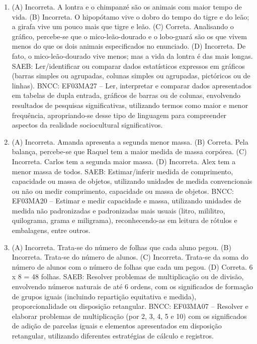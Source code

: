 \begin{enumerate}
\item
(A) Incorreta. A lontra e o chimpanzé são os animais com maior tempo de vida.
(B) Incorreta. O hipopótamo vive o dobro do tempo do tigre e do leão; a girafa vive um pouco mais que tigre e leão.
(C) Correta. Analisando o gráfico, percebe-se que o mico-leão-dourado e o lobo-guará são os que vivem menos do que os dois animais especificados no enunciado.
(D) Incorreta. De fato, o mico-leão-dourado vive menos; mas a vida da lontra é das mais longas.
SAEB: Ler/identificar ou comparar dados estatísticos
expressos em gráficos (barras simples ou agrupadas, colunas simples ou agrupadas, pictóricos ou de linhas).
BNCC: EF03MA27 -- Ler, interpretar e comparar dados apresentados em tabelas de dupla entrada,
gráficos de barras ou de colunas, envolvendo resultados de pesquisas significativas, utilizando
termos como maior e menor frequência, apropriando-se desse tipo de linguagem para
compreender aspectos da realidade sociocultural significativos.

\item
(A) Incorreta. Amanda apresenta a segunda menor massa.
(B) Correta. Pela balança, percebe-se que Raquel tem a maior medida de massa corpórea.
(C) Incorreta. Carlos tem a segunda maior massa.
(D) Incorreta. Alex tem a menor massa de todos.
SAEB: Estimar/inferir medida de comprimento, capacidade ou
massa de objetos, utilizando unidades de medida convencionais ou não ou
medir comprimento, capacidade ou massa de objetos.
BNCC: EF03MA20 -- Estimar e medir capacidade e massa, utilizando unidades de medida não
padronizadas e padronizadas mais usuais (litro, mililitro, quilograma, grama e miligrama),
reconhecendo-as em leitura de rótulos e embalagens, entre outros.

\item
(A) Incorreta. Trata-se do número de folhas que cada aluno pegou.
(B) Incorreta. Trata-se do número de alunos.
(C) Incorreta. Trata-se da soma do número de alunos com o número de folhas que cada um pegou.
(D) Correta. 6 x 8 = 48 folhas.
SAEB: Resolver problemas de multiplicação ou de divisão, envolvendo números naturais de até 6 ordens, com os significados de formação de grupos iguais (incluindo repartição equitativa e medida), proporcionalidade ou disposição retangular.
BNCC: EF03MA07 – Resolver e elaborar problemas de multiplicação (por 2, 3, 4, 5 e 10) com os
significados de adição de parcelas iguais e elementos apresentados em disposição retangular,
utilizando diferentes estratégias de cálculo e registros.
\end{enumerate}

